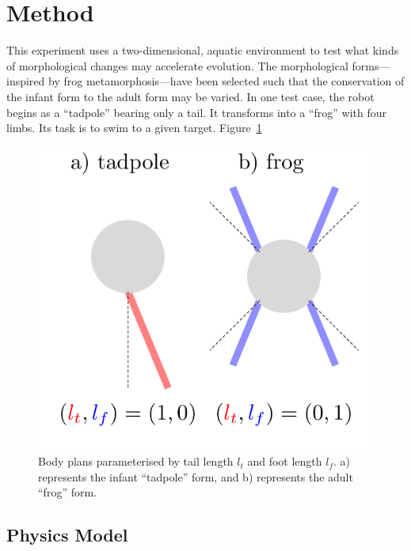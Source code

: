 \section{Method}

This experiment uses a two-dimensional, aquatic environment to test
what kinds of morphological changes may accelerate evolution. The
morphological forms---inspired by frog metamorphosis---have been
selected such that the conservation of the infant form to the adult
form may be varied. In one test case, the robot begins as a
``tadpole'' bearing only a tail. It transforms into a ``frog'' with
four limbs. Its task is to swim to a given
target. Figure~\ref{morphology}

\begin{figure}[h]
  \centering
  \includegraphics[scale=0.5]{fig/forms.pdf} 
  \vspace{-30pt}
  \caption[Body plans]{\label{morphology}Body plans parameterised by
    tail length $l_t$ and foot length $l_f$. a) represents the infant
    ``tadpole'' form, and b) represents the adult ``frog'' form. }
\end{figure}

\subsection{Physics Model}

